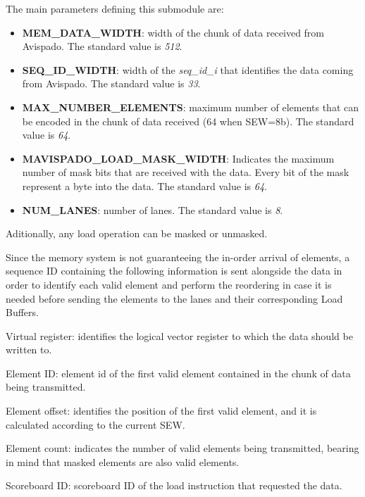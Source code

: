 The main parameters defining this submodule are:
\begin{itemize}
    \item \textbf{MEM\_DATA\_WIDTH}: width of the chunk of data received from Avispado. The standard value is \textit{512}.
    
    \item \textbf{SEQ\_ID\_WIDTH}: width of the \textit{seq\_id\_i} that identifies the data coming from Avispado. The standard value is \textit{33}.
    
    \item \textbf{MAX\_NUMBER\_ELEMENTS}: maximum number of elements that can be encoded in the chunk of data received (64 when SEW=8b). The standard value is \textit{64}.
    
    \item \textbf{MAVISPADO\_LOAD\_MASK\_WIDTH}: Indicates the maximum number of mask bits that are received with the data. Every bit of the mask represent a byte into the data. The standard value is \textit{64}.
    
    \item \textbf{NUM\_LANES}: number of lanes. The standard value is \textit{8}.
\end{itemize}





Aditionally, any load operation can be masked or unmasked.

Since the memory system is not guaranteeing the in-order arrival of elements, a sequence ID containing the following information is sent alongside the data in order to identify each valid element and perform the reordering in case it is needed before sending the elements to the lanes and their corresponding Load Buffers.

Virtual register: identifies the logical vector register to which the data should be written to.

Element ID: element id of the first valid element contained in the chunk of data being transmitted.

Element offset: identifies the position of the first valid element, and it is calculated according to the current SEW.

Element count: indicates the number of valid elements being transmitted, bearing in mind that masked elements are also valid elements.

Scoreboard ID: scoreboard ID of the load instruction that requested the data.






